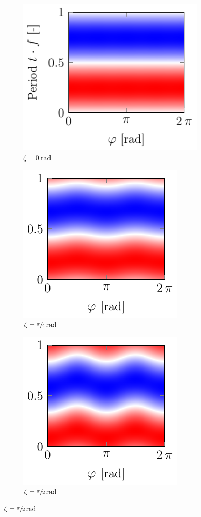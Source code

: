  \begin{figure}
  \centering
  \begin{subfigure}[b]{0.35\textwidth}
    \centering
    \caption{$\zeta = \SI{0}{\radian}$}
    \includegraphics[]{Plots/cache/viscous_torque_0.pdf}
  \end{subfigure}
  \hfill
  \begin{subfigure}[b]{0.3\textwidth}
    \centering
    \caption{$\zeta = \sfrac{\pi}{4}\,\si{\radian}$}
    \includegraphics[]{Plots/cache/viscous_torque_1.pdf}
  \end{subfigure}
  \hfill
  \begin{subfigure}[b]{0.3\textwidth}
    \centering
    \caption{$\zeta = \sfrac{\pi}{2}\,\si{\radian}$}
    \includegraphics[]{Plots/cache/viscous_torque_2.pdf}

\end{subfigure}
\end{figure}
